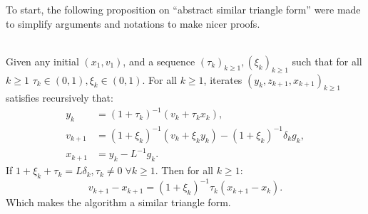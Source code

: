 \documentclass[12pt]{article}
\begin{document}
    To start, the following proposition on ``abstract similar triangle form'' were made to simplify arguments and notations to make nicer proofs. 

    \begin{proposition}\label{prop:abs-st-form}\;\\
        Given any initial $(x_1, v_1)$, and a sequence $(\tau_k)_{k \ge 1}, (\xi_k)_{k \ge 1}$ such that for all $k \ge 1$ $\tau_k \in (0, 1), \xi_k \in (0, 1)$. 
        For all $k\ge 1$, iterates $(y_k, z_{k + 1}, x_{k + 1})_{k \ge 1}$ satisfies recursively that: 
        \begin{align*}
            y_k &= (1 + \tau_k)^{-1}(v_k + \tau_k x_k),
            \\
            v_{k + 1} &= (1 + \xi_k)^{-1}(v_k + \xi_k y_k) - (1 + \xi_k)^{-1}\delta_k g_k,
            \\
            x_{k + 1} &= y_k - L^{-1} g_k. 
        \end{align*}
        If $1 + \xi_k + \tau_k = L\delta_k, \tau_k \neq 0\; \forall k \ge 1$. 
        Then for all $k \ge 1$: 
        $$
            v_{k + 1} - x_{k + 1} = (1 + \xi_k)^{-1}\tau_k(x_{k + 1} - x_k). 
        $$
        Which makes the algorithm a similar triangle form. 
    \end{proposition}
\end{document}
